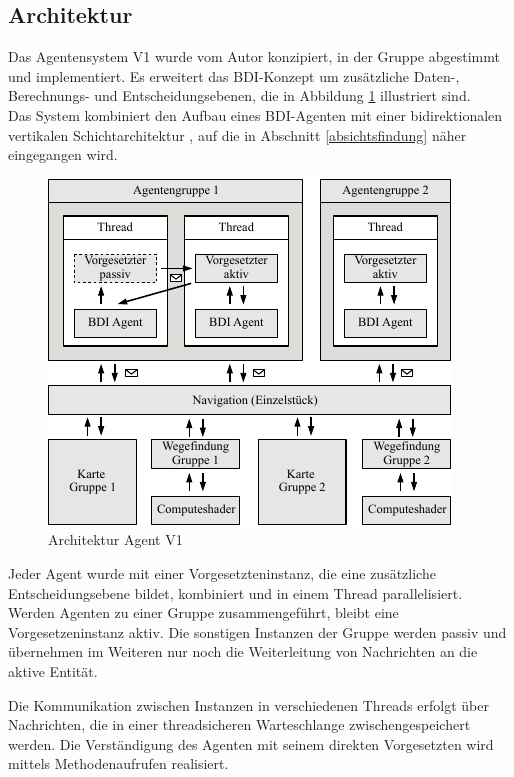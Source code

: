 \documentclass[runningheads]{llncs}
\begin{document}
\subsection{Architektur}\label{agentV1}
Das Agentensystem V1 wurde vom Autor konzipiert, in der Gruppe abgestimmt und implementiert. Es erweitert das BDI-Konzept \cite{Bratman1987} um zusätzliche Daten-, Berechnungs- und Entscheidungsebenen, die in Abbildung \ref{g3:architecture} illustriert sind. \\
Das System kombiniert den Aufbau eines BDI-Agenten \cite[S. 58]{Weiss2000} mit einer bidirektionalen vertikalen Schichtarchitektur \cite[S. 61-62]{Weiss2000}, auf die in Abschnitt
\ref{absichtsfindung} näher eingegangen wird.

\begin{figure}[h]
\centering
\includegraphics[scale=1]{./Referenzen/Architekturdiagramm.pdf}
\caption{Architektur Agent V1}
\label{g3:architecture}
\end{figure}

Jeder Agent wurde mit einer Vorgesetzteninstanz, die eine zusätzliche Entscheidungsebene bildet, kombiniert und in einem Thread parallelisiert. Werden Agenten zu einer Gruppe zusammengeführt, bleibt eine Vorgesetzeninstanz aktiv. Die sonstigen Instanzen der Gruppe werden passiv und übernehmen im Weiteren nur noch die Weiterleitung von Nachrichten an die aktive Entität.

Die Kommunikation zwischen Instanzen in verschiedenen Threads erfolgt über Nachrichten, die in einer threadsicheren Warteschlange zwischengespeichert werden. Die Verständigung des Agenten mit seinem direkten Vorgesetzten wird mittels Methodenaufrufen realisiert.
\end{document}
